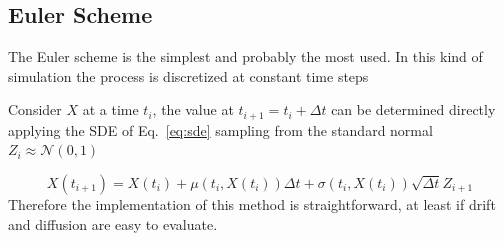 \subsection{Euler Scheme}
The Euler scheme is the simplest and probably the most used. In this kind of simulation the process is discretized at constant time steps 

Consider $X$ at a time $t_i$, the value at $t_{i+1} = t_i +\Delta t$ can be determined directly applying the SDE of Eq.~\ref{eq:sde} sampling from the standard normal $Z_i \approx \mathcal{N}(0,1)$

\begin{equation}
X(t_{i+1}) = X(t_i) + \mu(t_i , X(t_i))\Delta t + \sigma(t_i , X(t_i))\sqrt{\Delta t}Z_{i+1}
\label{eq:euler_scheme}
\end{equation}
Therefore the implementation of this method is straightforward, at least if drift and diffusion are easy to evaluate.

